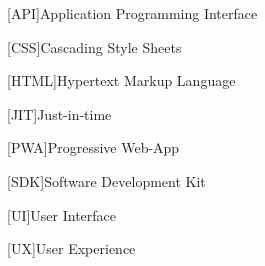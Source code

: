 \begin{acronym}[AAAAA]

[API]{Application Programming Interface}

[CSS]{Cascading Style Sheets}

[HTML]{Hypertext Markup Language}

[JIT]{Just-in-time}

[PWA]{Progressive Web-App}

[SDK]{Software Development Kit}

[UI]{User Interface}

[UX]{User Experience}

\end{acronym}
